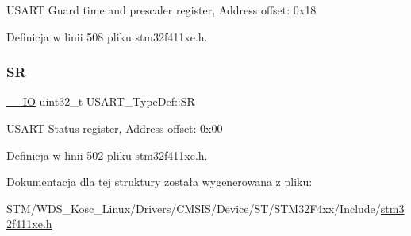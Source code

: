 U\+S\+A\+RT Guard time and prescaler register, Address offset\+: 0x18 

Definicja w linii 508 pliku stm32f411xe.\+h.

\mbox{\label{struct_u_s_a_r_t___type_def_a706005f59139b9ff8ee5755677e12bc7}} 
\subsubsection{\texorpdfstring{SR}{SR}}
{\footnotesize\ttfamily \hyperlink{core__sc300_8h_aec43007d9998a0a0e01faede4133d6be}{\+\_\+\+\_\+\+IO} uint32\+\_\+t U\+S\+A\+R\+T\+\_\+\+Type\+Def\+::\+SR}

U\+S\+A\+RT Status register, Address offset\+: 0x00 

Definicja w linii 502 pliku stm32f411xe.\+h.



Dokumentacja dla tej struktury została wygenerowana z pliku\+:\begin{DoxyCompactItemize}
\item 
S\+T\+M/\+W\+D\+S\+\_\+\+Kosc\+\_\+\+Linux/\+Drivers/\+C\+M\+S\+I\+S/\+Device/\+S\+T/\+S\+T\+M32\+F4xx/\+Include/\hyperlink{stm32f411xe_8h}{stm32f411xe.\+h}\end{DoxyCompactItemize}
